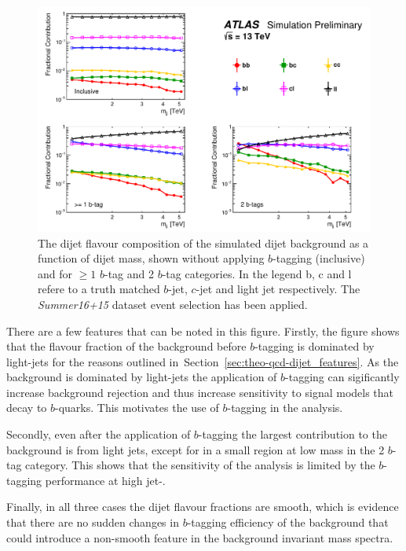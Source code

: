 \begin{figure}[!ht]
  \begin{center}
    \includegraphics[width=0.99\linewidth, angle=0]{figs/Dibjet/ICHEP/evt-summer_flavcomp.pdf}
  \end{center}
  \caption{The dijet flavour composition of the simulated dijet background as a function of dijet mass,
    shown without applying $b$-tagging (inclusive) and for $\geq1$ $b$-tag and 2 $b$-tag categories.
    In the legend b, c and l refere to a truth matched $b$-jet, $c$-jet and light jet respectively.
    The \textit{Summer16+15} dataset event selection has been applied.
  }
  \label{fig:evt-summer_flavcomp}
\end{figure}

There are a few features that can be noted in this figure.
Firstly, the figure shows that the flavour fraction of the background before $b$-tagging is dominated by light-jets
for the reasons outlined in~Section~\ref{sec:theo-qcd-dijet_features}.
As the background is dominated by light-jets the application
of $b$-tagging can sigificantly increase background rejection
and thus increase sensitivity to signal models that decay to $b$-quarks.
This motivates the use of $b$-tagging in the analysis.

Secondly, even after the application of $b$-tagging the largest contribution to the background is from light jets,
except for in a small region at low mass in the 2 $b$-tag category.
This shows that the sensitivity of the analysis is limited by the
$b$-tagging performance at high jet-\pT.

Finally, in all three cases the dijet flavour fractions are smooth, which is evidence that
there are no sudden changes in $b$-tagging efficiency of the background that could introduce
a non-smooth feature in the background invariant mass spectra.

